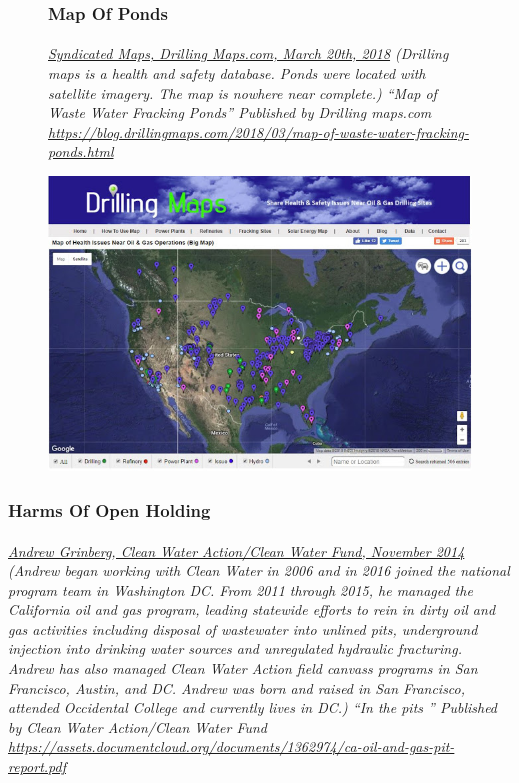 \documentclass{article}
\begin{document}
\begin{figure}[h!] 
  \subsubsection{Map Of Ponds}
  \paragraph{}
  \small
  \textit{
  \underline{Syndicated Maps, Drilling Maps.com, March 20th, 2018}
  (Drilling maps is a health and safety database. Ponds were located with satellite imagery. The map is nowhere near complete.) “Map of Waste Water Fracking Ponds” Published by Drilling maps.com  
  \url{https://blog.drillingmaps.com/2018/03/map-of-waste-water-fracking-ponds.html}}
  \normalsize


  \includegraphics[width=\linewidth]{openholdingmap.jpg}
\end{figure}

\subsubsection{Harms Of Open Holding}
\paragraph{}
\small
\textit{  
\underline{Andrew Grinberg, Clean Water Action/Clean Water Fund, November 2014}
  (Andrew began working with Clean Water in 2006 and in 2016 joined the national program team in Washington DC. From 2011 through 2015, he managed the California oil and gas program, leading statewide efforts to rein in dirty oil and gas activities including disposal of wastewater into unlined pits, underground injection into drinking water sources and unregulated hydraulic fracturing. Andrew has also managed Clean Water Action field canvass programs in San Francisco, Austin, and DC. Andrew was born and raised in San Francisco, attended Occidental College and currently lives in DC.) “In the pits ” Published by Clean Water Action/Clean Water Fund 
\url{https://assets.documentcloud.org/documents/1362974/ca-oil-and-gas-pit-report.pdf} }
\normalsize
\end{document}
